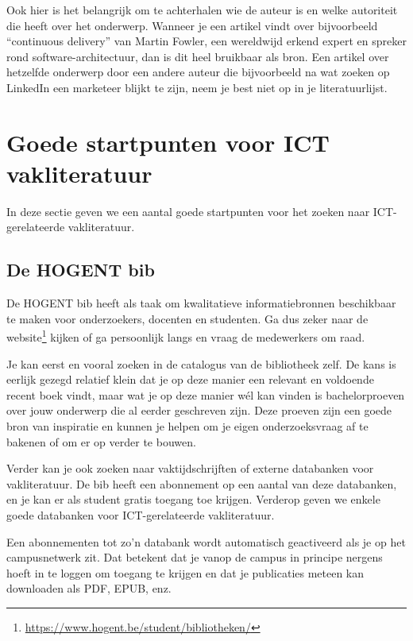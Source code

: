 Ook hier is het belangrijk om te achterhalen wie de auteur is en welke autoriteit die heeft over het onderwerp. Wanneer je een artikel vindt over bijvoorbeeld ``continuous delivery'' van Martin Fowler, een wereldwijd erkend expert en spreker rond software-architectuur, dan is dit heel bruikbaar als bron. Een artikel over hetzelfde onderwerp door een andere auteur die bijvoorbeeld na wat zoeken op LinkedIn een marketeer blijkt te zijn, neem je best niet op in je literatuurlijst.

\section{Goede startpunten voor ICT vakliteratuur}%
\label{sec:startpunten-ict-vakliteratuur}

In deze sectie geven we een aantal goede startpunten voor het zoeken naar ICT-gerelateerde vakliteratuur.

\subsection{De HOGENT bib}%
\label{ssec:hogent-bib}

De HOGENT bib heeft als taak om kwalitatieve informatiebronnen beschikbaar te maken voor onderzoekers, docenten en studenten. Ga dus zeker naar de website\footnote{\url{https://www.hogent.be/student/bibliotheken/}} kijken of ga persoonlijk langs en vraag de medewerkers om raad.

Je kan eerst en vooral zoeken in de catalogus van de bibliotheek zelf. De kans is eerlijk gezegd relatief klein dat je op deze manier een relevant en voldoende recent boek vindt, maar wat je op deze manier wél kan vinden is bachelorproeven over jouw onderwerp die al eerder geschreven zijn. Deze proeven zijn een goede bron van inspiratie en kunnen je helpen om je eigen onderzoeksvraag af te bakenen of om er op verder te bouwen.

Verder kan je ook zoeken naar vaktijdschrijften of externe databanken voor vakliteratuur. De bib heeft een abonnement op een aantal van deze databanken, en je kan er als student gratis toegang toe krijgen. Verderop geven we enkele goede databanken voor ICT-gerelateerde vakliteratuur.

Een abonnementen tot zo'n databank wordt automatisch geactiveerd als je op het campusnetwerk zit. Dat betekent dat je vanop de campus in principe nergens hoeft in te loggen om toegang te krijgen en dat je publicaties meteen kan downloaden als PDF, EPUB, enz.

